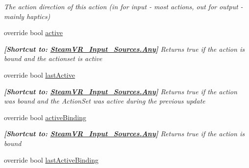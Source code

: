 \begin{DoxyCompactItemize}
\begin{DoxyCompactList}\small\item\em The action direction of this action (in for input -\/ most actions, out for output -\/ mainly haptics) \end{DoxyCompactList}\item 
override bool \mbox{\hyperlink{class_valve_1_1_v_r_1_1_steam_v_r___action_a4737fe5382afbd927eb06bdcadbbbbf4}{active}}
\begin{DoxyCompactList}\small\item\em {\bfseries{\mbox{[}Shortcut to\+: \mbox{\hyperlink{namespace_valve_1_1_v_r_a82e5bf501cc3aa155444ee3f0662853faed36a1ef76a59ee3f15180e0441188ad}{Steam\+V\+R\+\_\+\+Input\+\_\+\+Sources.\+Any}}\mbox{]}}} Returns true if the action is bound and the actionset is active \end{DoxyCompactList}\item 
override bool \mbox{\hyperlink{class_valve_1_1_v_r_1_1_steam_v_r___action_a99ec33a591be6c792dff8c13b32fe675}{last\+Active}}
\begin{DoxyCompactList}\small\item\em {\bfseries{\mbox{[}Shortcut to\+: \mbox{\hyperlink{namespace_valve_1_1_v_r_a82e5bf501cc3aa155444ee3f0662853faed36a1ef76a59ee3f15180e0441188ad}{Steam\+V\+R\+\_\+\+Input\+\_\+\+Sources.\+Any}}\mbox{]}}} Returns true if the action was bound and the Action\+Set was active during the previous update \end{DoxyCompactList}\item 
override bool \mbox{\hyperlink{class_valve_1_1_v_r_1_1_steam_v_r___action_ad275cb288073b48f2b0e92a4cc797014}{active\+Binding}}
\begin{DoxyCompactList}\small\item\em {\bfseries{\mbox{[}Shortcut to\+: \mbox{\hyperlink{namespace_valve_1_1_v_r_a82e5bf501cc3aa155444ee3f0662853faed36a1ef76a59ee3f15180e0441188ad}{Steam\+V\+R\+\_\+\+Input\+\_\+\+Sources.\+Any}}\mbox{]}}} Returns true if the action is bound \end{DoxyCompactList}\item 
override bool \mbox{\hyperlink{class_valve_1_1_v_r_1_1_steam_v_r___action_ad45e21db94737a22efd0efcab6401fec}{last\+Active\+Binding}}

\end{DoxyCompactItemize}
